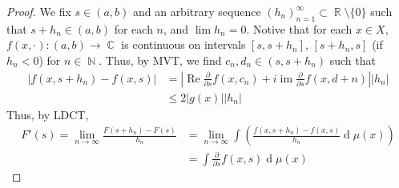 \documentclass[11pt, a4paper]{memoir}
\DeclareMathOperator{\N}{{\mathbb{N}}}
\DeclareMathOperator{\R}{{\mathbb{R}}}
\DeclareMathOperator{\C}{{\mathbb{C}}}
\theoremstyle{change}
\theoremstyle{plain}
\theoremstyle{nonumberplain}
\newtheorem{proof}{Proof}
\DeclareMathOperator{\im}{im}
\renewcommand{\Re}{\ensuremath{\operatorname{Re}}}
\renewcommand{\d}[1]{\ensuremath{\operatorname{d}\!{#1}}}
\numberwithin{equation}{section}
\begin{document}
\begin{proof}
    We fix $s\in(a,b)$ and an arbitrary sequence $(h_n)_{n=1}^\infty\subset\R\setminus\{0\}$ such that $s+h_n\in(a,b)$ for each $n$, and $\lim h_n=0$.
    Notive that for each $x\in X$, $f(x,\cdot):(a,b)\to\C$ is continuous on intervals $[s,s+h_n]$, $[s+h_n,s]$ (if $h_n<0$) for $n\in\N$.
    Thus, by MVT, we find $c_n,d_n\in(s,s+h_n)$ such that
    \begin{align*}
        |f(x,s+h_n)-f(x,s)| &= \left\lvert\Re\frac{\partial}{\partial s}f(x,c_n)+i\im\frac{\partial}{\partial s}f(x,d+n)\right\rvert|h_n|\\
                            &\leq 2|g(x)||h_n|
    \end{align*}
    Thus, by LDCT,
    \begin{align*}
        F'(s)=\lim_{n\to\infty}\frac{F(s+h_n)-F(s)}{h_n}&=\lim_{n\to\infty}\int\left(\frac{f(x,s+h_n)-f(x,s)}{h_n}\d{\mu(x)}\right)\\
                                                        &= \int\frac{\partial}{\partial s}f(x,s)\d{\mu(x)}
    \end{align*}
\end{proof}
\end{document}
